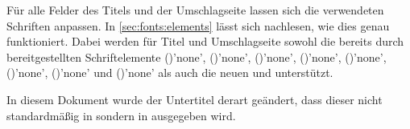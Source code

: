 \begin{Declaration*}{}
\begin{Declaration*}{}
\begin{Declaration*}{}
\begin{Declaration}[v2.02]{}
\begin{Declaration}[v2.02]{}
Für alle Felder des Titels und der Umschlagseite lassen sich die verwendeten
Schriften anpassen. In \autoref{sec:fonts:elements} lässt sich nachlesen, wie 
dies genau funktioniert. Dabei werden für Titel und Umschlagseite sowohl die 
bereits durch \KOMAScript{} bereitgestellten Schriftelemente
()'none', 
()'none', 
()'none', 
()'none', 
()'none', 
()'none',
()'none' und 
()'none'
als auch die neuen  und  unterstützt.
%
\begin{Example}
In diesem Dokument wurde der Untertitel derart geändert, dass dieser nicht 
standardmäßig in \DIN sondern in  ausgegeben wird.
\begin{Code}[escapechar=§]
\end{Code}
\end{Example}
\end{Declaration}
\end{Declaration}


\end{Declaration*}
\end{Declaration*}
\end{Declaration*}
